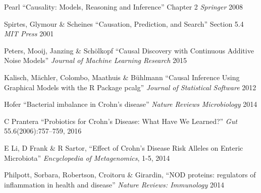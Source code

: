 \documentclass[twocolumn,12pt]{article}
\begin{document}
\begin{thebibliography}{11}
 Pearl ``Causality: Models, Reasoning and Inference''
  Chapter 2 \textit{Springer} 2008

 Spirtes, Glymour \& Scheines ``Causation,
  Prediction, and Search'' Section 5.4 \textit{MIT Press} 2001

 Peters, Mooij, Janzing \& Sch{\"o}lkopf ``Causal
  Discovery with Continuous Additive Noise Models'' \textit{Journal of
    Machine Learning Research} 2015

 Kalisch, M{\"a}chler, Colombo, Maathuis \&
  B{\"u}hlmann ``Causal Inference Using Graphical Models with the R
  Package pcalg'' \textit{Journal of Statistical Software} 2012

 Hofer ``Bacterial imbalance in Crohn's disease''
  \textit{Nature Reviews Microbiology} 2014

 C Prantera ``Probiotics for Crohn’s Disease: What
  Have We Learned?'' \textit{Gut} 55.6(2006):757–759, 2016

 E Li, D Frank \& R Sartor, ``Effect of Crohn’s Disease Risk
  Alleles on Enteric Microbiota'' \textit{Encyclopedia of
    Metagenomics},  1-5, 2014

  Philpott, Sorbara, Robertson, Croitoru \& Girardin,
  ``NOD proteins: regulators of inflammation in health and disease''
  \textit{Nature Reviews: Immunology} 2014
  
\end{thebibliography}
\end{document}
